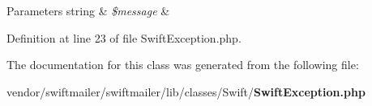 \begin{DoxyParams}[1]{Parameters}
string & {\em \$message} & \\
\hline
\end{DoxyParams}


Definition at line 23 of file Swift\+Exception.\+php.



The documentation for this class was generated from the following file\+:\begin{DoxyCompactItemize}
\item 
vendor/swiftmailer/swiftmailer/lib/classes/\+Swift/{\bf Swift\+Exception.\+php}\end{DoxyCompactItemize}
